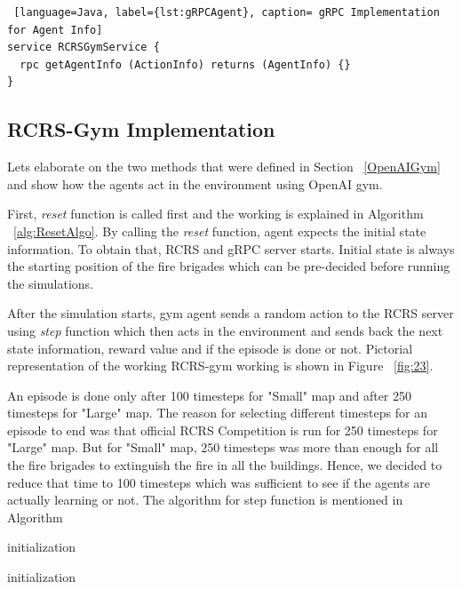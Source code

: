 \documentclass[12pt]{report}
\begin{document}
\begin{lstlisting} [language=Java, label={lst:gRPCAgent}, caption= gRPC Implementation for Agent Info] 
service RCRSGymService {
  rpc getAgentInfo (ActionInfo) returns (AgentInfo) {}
}
\end{lstlisting}

\subsection{RCRS-Gym Implementation} \label{RCRSGymImplementation}

Lets elaborate on the two methods that were defined in Section ~\ref{OpenAIGym} and show how the agents act in the environment using OpenAI gym. 

First, \emph{reset} function is called first and the working is explained in Algorithm ~\ref{alg:ResetAlgo}. By calling the \emph{reset} function, agent expects the initial state information. To obtain that, RCRS and gRPC server starts. Initial state is always the starting position of the fire brigades which can be pre-decided before running the simulations.

After the simulation starts, gym agent sends a random action to the RCRS server using \emph{step} function which then acts in the environment and sends back the next state information, reward value and if the episode is done or not. Pictorial representation of the working RCRS-gym working is shown in Figure ~\ref{fig:23}. 

An episode is done only after 100 timesteps for "Small" map and after 250 timesteps for "Large" map. The reason for selecting different timesteps for an episode to end was that official RCRS Competition is run for 250 timesteps for "Large" map. But for "Small" map, 250 timesteps was more than enough for all the fire brigades to extinguish the fire in all the buildings. Hence, we decided to reduce that time to 100 timesteps which was sufficient to see if the agents are actually learning or not. The algorithm for step function is mentioned in Algorithm 

\begin{algorithm}[H]
\SetAlgoLined
{}
 initialization\;
 \caption{\emph{Reset} implementation}
 \label{alg:ResetAlgo}
\end{algorithm}

\begin{algorithm}[H]
\SetAlgoLined
{}
 initialization\;
 \caption{\emph{Step} implementation}
 \label{alg:StepAlgo}
\end{algorithm}
\end{document}
